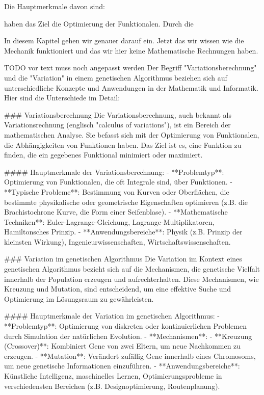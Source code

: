 Die Hauptmerkmale davon sind:



haben das Ziel die Optimierung der Funktionalen. Durch 
die

In diesem Kapitel gehen wir genauer darauf ein. 
Jetzt das wir wissen wie die Mechanik funktioniert und das wir hier keine 
Mathematische Rechnungen haben. 

TODO vor text muss noch angepasst werden
Der Begriff "Variationsberechnung" und die "Variation" in einem genetischen Algorithmus beziehen sich auf unterschiedliche Konzepte und Anwendungen in der Mathematik und Informatik. Hier sind die Unterschiede im Detail:

### Variationsberechnung
Die Variationsberechnung, auch bekannt als Variationsrechnung (englisch "calculus of variations"), ist ein Bereich der mathematischen Analyse. Sie befasst sich mit der Optimierung von Funktionalen, die Abhängigkeiten von Funktionen haben. Das Ziel ist es, eine Funktion zu finden, die ein gegebenes Funktional minimiert oder maximiert.

#### Hauptmerkmale der Variationsberechnung:
- **Problemtyp**: Optimierung von Funktionalen, die oft Integrale sind, über Funktionen.
- **Typische Probleme**: Bestimmung von Kurven oder Oberflächen, die bestimmte physikalische oder geometrische Eigenschaften optimieren (z.B. die Brachistochrone Kurve, die Form einer Seifenblase).
- **Mathematische Techniken**: Euler-Lagrange-Gleichung, Lagrange-Multiplikatoren, Hamiltonsches Prinzip.
- **Anwendungsbereiche**: Physik (z.B. Prinzip der kleinsten Wirkung), Ingenieurwissenschaften, Wirtschaftswissenschaften.

### Variation im genetischen Algorithmus
Die Variation im Kontext eines genetischen Algorithmus bezieht sich auf die Mechanismen, die genetische Vielfalt innerhalb der Population erzeugen und aufrechterhalten. Diese Mechanismen, wie Kreuzung und Mutation, sind entscheidend, um eine effektive Suche und Optimierung im Lösungsraum zu gewährleisten.

#### Hauptmerkmale der Variation im genetischen Algorithmus:
- **Problemtyp**: Optimierung von diskreten oder kontinuierlichen Problemen durch Simulation der natürlichen Evolution.
- **Mechanismen**: 
  - **Kreuzung (Crossover)**: Kombiniert Gene von zwei Eltern, um neue Nachkommen zu erzeugen.
  - **Mutation**: Verändert zufällig Gene innerhalb eines Chromosoms, um neue genetische Informationen einzuführen.
- **Anwendungsbereiche**: Künstliche Intelligenz, maschinelles Lernen, Optimierungsprobleme in verschiedensten Bereichen (z.B. Designoptimierung, Routenplanung).

